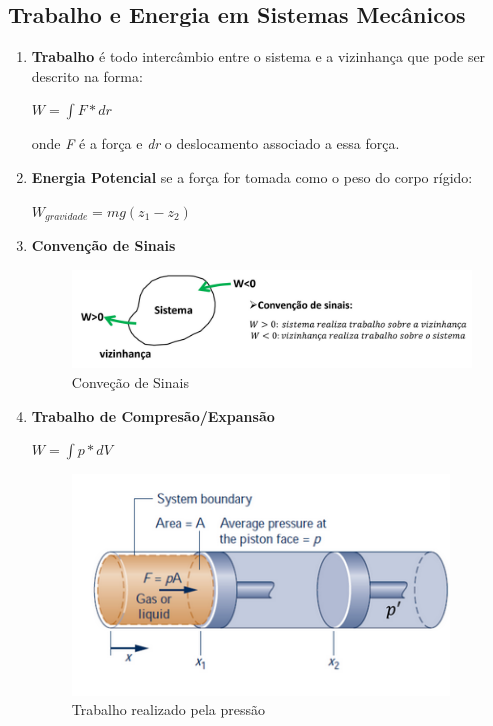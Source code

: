 \documentclass[a4paper, 12pt]{article}
\begin{document}
\subsection{Trabalho e Energia em Sistemas Mecânicos}
	\begin{enumerate}
		\item \textbf{Trabalho} é todo intercâmbio entre o sistema e a vizinhança  que pode ser descrito na forma:
		\begin{center}
			\large
			$ W = \int F*dr $
		\end{center}
		onde \textit{F} é a força e \textit{dr} o deslocamento associado a essa força.
		
		\item \textbf{Energia Potencial} se a força for tomada como o peso do corpo rígido:
		\begin{center}
			\large
			$ W_{gravidade} = mg(z_{1}-z_{2}) $
		\end{center}
	
		\item \textbf{Convenção de Sinais}
			\begin{figure}[h]
				\includegraphics[width=15cm]{cs.png}
				\centering
				\caption{Conveção de Sinais}
			\end{figure}
			
		\item \textbf{Trabalho de Compresão/Expansão}\\
			\begin{center}
				\large
				$ W = \int p*dV $
			\end{center}

			\begin{figure}[h]
				\includegraphics[width = 10cm]{tc.png}
				\centering
				\caption{Trabalho realizado pela pressão}
			\end{figure}
		

\end{enumerate}
\end{document}
